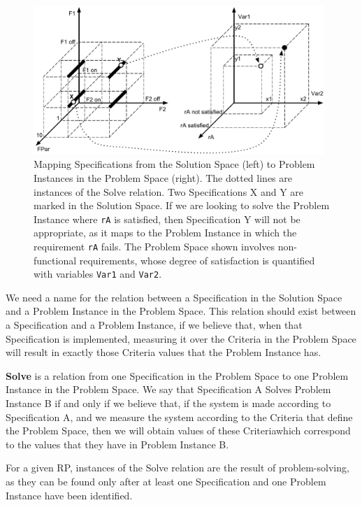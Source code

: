 \documentclass[graybox]{svmult}
\newcommand{\xb}[1]{\textbf{#1}}
\newcommand{\xt}[1]{\texttt{#1}}
\newcommand{\req}[1]{\xt{#1}}
\newcommand{\RP}{RP}
\newcommand{\SolutionSpace}{Solution Space}
\newcommand{\ProblemSpace}{Problem Space}
\newcommand{\Specification}{Specification}
\newcommand{\Criteria}{Criteria}
\newcommand{\ProblemInstance}{Problem Instance}
\newcommand{\Solve}{Solve}
\begin{document}
\begin{figure}[t]
	\centering
	\includegraphics[width=110mm]{Figures/f-ex-problem-space-solution-space-mapping}
\caption{Mapping \Specification s from the \SolutionSpace{} (left) to \ProblemInstance s in the \ProblemSpace{} (right). The dotted lines are instances of the \Solve{} relation. Two \Specification s X and Y are marked in the \SolutionSpace. If we are looking to solve the \ProblemInstance{} where \req{rA} is satisfied, then \Specification{} Y will not be appropriate, as it maps to the \ProblemInstance{} in which the requirement \req{rA} fails. The \ProblemSpace{} shown involves non-functional requirements, whose degree of satisfaction is quantified with variables \req{Var1} and \req{Var2}.}
\label{f:ex:problem-space-solution-space-mapping}
\end{figure}

We need a name for the relation between a \Specification{} in the \SolutionSpace{} and a \ProblemInstance{} in the \ProblemSpace. This relation should exist between a \Specification{} and a \ProblemInstance, if we believe that, when that \Specification{} is implemented, measuring it over the \Criteria{} in the \ProblemSpace{} will result in exactly those \Criteria{} values that the \ProblemInstance{} has.

\begin{definition}\label{d:solve}
\xb{\Solve} is a relation from one \Specification{} in the \ProblemSpace{} to one \ProblemInstance{} in the \ProblemSpace. We say that \Specification{} A \Solve s \ProblemInstance{} B if and only if we believe that, if the system is made according to \Specification{} A, and we measure the system according to the \Criteria{} that define the \ProblemSpace{}, then we will obtain values of these \Criteria which correspond to the values that they have in \ProblemInstance{} B.
\end{definition}

For a given \RP, instances of the \Solve{} relation are the result of problem-solving, as they can be found only after at least one \Specification{} and one \ProblemInstance{} have been identified.
\end{document}
